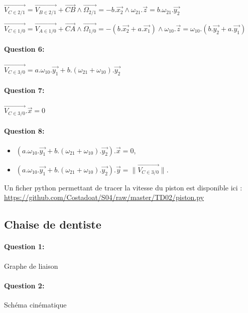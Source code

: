 $\overrightarrow{V_{C\in 2/1}}=\overrightarrow{V_{B\in 2/1}}+\overrightarrow{CB}\wedge \overrightarrow{\Omega_{2/1}}=-b.\overrightarrow{x_2}\wedge \omega_{21}.\overrightarrow{z}=b.\omega_{21}.\overrightarrow{y_2}$

$\overrightarrow{V_{C\in 1/0}}=\overrightarrow{V_{A\in 1/0}}+\overrightarrow{CA}\wedge \overrightarrow{\Omega_{1/0}}=-(b.\overrightarrow{x_2}+a.\overrightarrow{x_1})\wedge \omega_{10}.\overrightarrow{z}=\omega_{10}.(b.\overrightarrow{y_2}+a.\overrightarrow{y_1})$

\paragraph{Question 6:} $\overrightarrow{V_{C\in 3/0}}=a.\omega_{10}.\overrightarrow{y_1}+b.(\omega_{21}+\omega_{10}).\overrightarrow{y_2}$

\paragraph{Question 7:} $\overrightarrow{V_{C\in 3/0}}.\overrightarrow{x}=0$

\paragraph{Question 8:} 
\begin{itemize}
 \item $(a.\omega_{10}.\overrightarrow{y_1}+b.(\omega_{21}+\omega_{10}).\overrightarrow{y_2}).\overrightarrow{x}=0$,
 \item $(a.\omega_{10}.\overrightarrow{y_1}+b.(\omega_{21}+\omega_{10}).\overrightarrow{y_2}).\overrightarrow{y}=\|\overrightarrow{V_{C\in 3/0}}\|$.
\end{itemize}

Un ficher python permettant de tracer la vitesse du piston est disponible ici : \url{https://github.com/Costadoat/S04/raw/master/TD02/piston.py}

\subsection{Chaise de dentiste}

\paragraph{Question 1:} Graphe de liaison

\paragraph{Question 2:} Schéma cinématique


